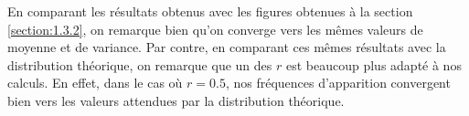 En comparant les résultats obtenus avec les figures obtenues à la section \ref{section:1.3.2}, on remarque bien qu'on converge vers les mêmes valeurs de moyenne et de variance. Par contre, 
en comparant ces mêmes résultats avec la distribution théorique, on remarque que un des $r$ est beaucoup plus adapté à nos calculs. En effet, dans le cas où $r = 0.5$, nos fréquences d'apparition 
convergent bien vers les valeurs attendues par la distribution théorique.